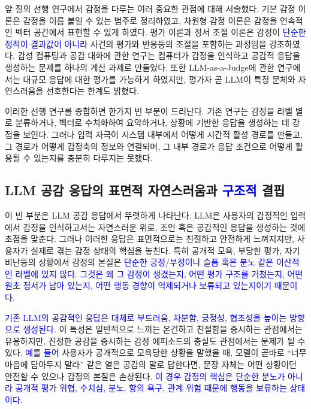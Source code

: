 ﻿\documentclass[11pt,a4paper]{article}
\begin{document}
앞 절의 선행 연구에서 감정을 다루는 여러 중요한 관점에 대해 서술했다. 기본 감정 이론은 감정을 이름 붙일 수 있는 범주로 정리하였고, 차원형 감정 이론은 감정을 연속적인 벡터 공간에서 표현할 수 있게 하였다. 평가 이론과 정서 조절 이론은 감정이 \textcolor{blue}{단순한 정적이 결과값이 아니라} 사건의 평가와 반응등의 조절을 포함하는 과정임을 강조하였다. 감성 컴퓨팅과 공감 대화에 관한 연구는 컴퓨터가 감정을 인식하고 공감적 응답을 생성하는 문제를 하나의 계산 과제로 만들었다. 또한 LLM-as-a-Judge에 관한 연구에서는 대규모 응답에 대한 평가를 가능하게 하였지만, 평가자 곧 LLM이 특정 문체와 자연스러움을 선호한다는 한계도 밝혔다.

이러한 선행 연구를 종합하면 한가지 빈 부분이 드러난다. 기존 연구는 감정을 라벨 별로 분류하거나, 벡터로 수치화하여 요약하거나, 상황에 기반한 응답을 생성하는 데 강점을 보인다. 그러나 입력 자극이 시스템 내부에서 어떻게 시간적 활성 경로를 만들고, 그 경로가 어떻게 감정축의 정보와 연결되며, 그 내부 경로가 응답 조건으로 어떻게 활용될 수 있는지를 충분히 다루지는 못했다.

\subsection{LLM 공감 응답의 표면적 자연스러움과 \textcolor{blue}{구조적} 결핍}

이 빈 부분은 LLM 공감 응답에서 뚜렷하게 나타난다. LLM은 사용자의 감정적인 입력에서 감정을 인식하고서는 자연스러운 위로, 조언 혹은 공감적인 응답을 생성하는 것에 초점을 맞춘다. 그러나 이러한 응답은 표면적으로는 친절하고 안전하게 느껴지지만, 사용자가 실제로 겪는 감정 상태의 핵심을 놓친다. 특히 공개적 모욕, 부당한 평가, 자기비난등의 상황에서 감정의 본질은 \textcolor{blue}{단순한 긍정/부정이나 슬픔 혹은 분노 같은 이산적인 라벨에 있지 않다}. \textcolor{blue}{그것은 왜 그 감정이 생겼는지, 어떤 평가 구조를 거쳤는지, 어떤 원초 정서가 남아 있는지, 어떤 행동 경향이 억제되거나 보류되고 있는지이기 때문이다.}

\textcolor{blue}{기존 LLM의 공감적인 응답은 대체로 부드러움, 차분함, 긍정성, 협조성을 높이는 방향으로 생성된다.} 이 특성은 일반적으로 느끼는 온건하고 친절함을 중시하는 관점에서는 유용하지만, 진정한 공감을 중시하는 감정 에피소드의 충실도 관점에서는 문제가 될 수 있다. \textcolor{blue}{예를 들어} 사용자가 공개적으로 모욕당한 상황을 말했을 때, 모델이 곧바로 ``너무 마음에 담아두지 말라'' 같은 옅은 공감의 말로 답한다면, 문장 자체는 어떤 상황이던 안전할 수 있으나 감정의 본질은 손상된다. \textcolor{blue}{이 경우 감정의 핵심은 \textcolor{blue}{단순한 분노가 아니라} 공개적 평가 위협, 수치심, 분노, 항의 욕구, 관계 위험 때문에 행동을 보류하는 상태이다.}
\end{document}
